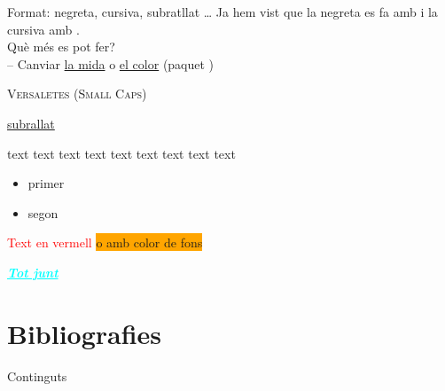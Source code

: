 \begin{frame}[fragile]{Format: negreta, cursiva, subratllat \dots}
\small{Ja hem vist que la negreta es fa amb  i la cursiva amb . \\
Què més es pot fer? \\
-- Canviar \href{https://www.overleaf.com/learn/latex/Font_sizes%2C_families%2C_and_styles}{la mida}
    o \href{https://www.overleaf.com/learn/latex/Using_colors_in_LaTeX}{el color} (paquet )
}
\begin{exampletwouptiny2}
\textsc{Versaletes (Small Caps)}

\underline{subrallat}

\tiny{text}
\scriptsize{text}
\footnotesize{text}
\small{text}
\normalsize{text}
\large{text}
\Large{text}
\LARGE{text}
\huge{text}
\end{exampletwouptiny2}
\begin{exampletwouptiny2}
\begin{itemize}
\color{blue}
\item primer
\item segon
\end{itemize}

\textcolor{red}{Text en vermell}
\colorbox{orange}{o amb color de fons}

\textcolor{cyan}{\underline{\large{
    \textit{\textbf{Tot junt}}}}}
\end{exampletwouptiny2}

\end{frame}


\section{Bibliografies}
\begin{frame}{Continguts}
\begin{multicols}{2}
\tableofcontents[currentsection]
\end{multicols}
\end{frame}


